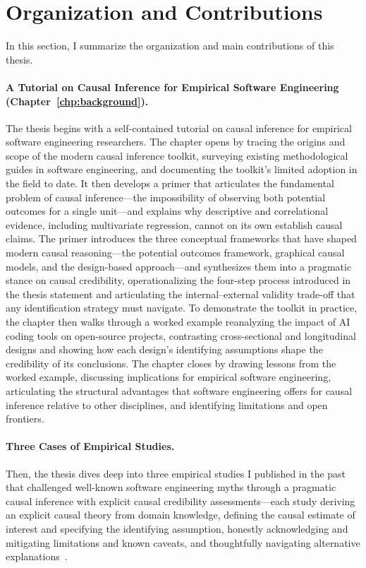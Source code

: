 \section{Organization and Contributions}

In this section, I summarize the organization and main contributions of this thesis.

\paragraph{A Tutorial on Causal Inference for Empirical Software Engineering (Chapter~\ref{chp:background}).}
The thesis begins with a self-contained tutorial on causal inference for empirical software engineering researchers.
The chapter opens by tracing the origins and scope of the modern causal inference toolkit, surveying existing methodological guides in software engineering, and documenting the toolkit's limited adoption in the field to date.
It then develops a primer that articulates the fundamental problem of causal inference---the impossibility of observing both potential outcomes for a single unit---and explains why descriptive and correlational evidence, including multivariate regression, cannot on its own establish causal claims.
The primer introduces the three conceptual frameworks that have shaped modern causal reasoning---the potential outcomes framework, graphical causal models, and the design-based approach---and synthesizes them into a pragmatic stance on causal credibility, operationalizing the four-step process introduced in the thesis statement and articulating the internal--external validity trade-off that any identification strategy must navigate.
To demonstrate the toolkit in practice, the chapter then walks through a worked example reanalyzing the impact of AI coding tools on open-source projects, contrasting cross-sectional and longitudinal designs and showing how each design's identifying assumptions shape the credibility of its conclusions.
The chapter closes by drawing lessons from the worked example, discussing implications for empirical software engineering, articulating the structural advantages that software engineering offers for causal inference relative to other disciplines, and identifying limitations and open frontiers.

\paragraph{Three Cases of Empirical Studies.}
Then, the thesis dives deep into three empirical studies I published in the past that challenged well-known software engineering myths through a pragmatic causal inference with explicit causal credibility assessments---each study deriving an explicit causal theory from domain knowledge, defining the causal estimate of interest and specifying the identifying assumption, honestly acknowledging and mitigating limitations and known caveats, and thoughtfully navigating alternative explanations~\cite{DBLP:journals/corr/abs-2502-06662, DBLP:journals/corr/abs-2412-13459, DBLP:conf/msr/HeMAKV26}.

